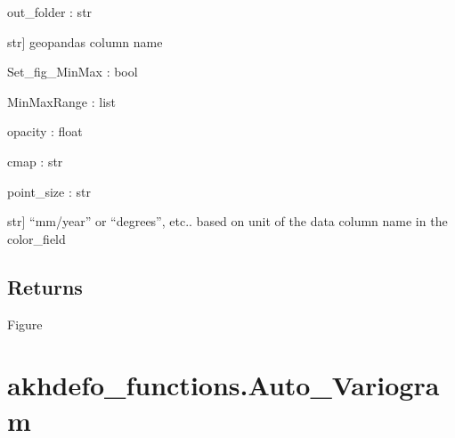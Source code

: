 \documentclass[letterpaper,10pt]{sphinxmanual}
\begin{document}
\begin{fulllineitems}
\sphinxAtStartPar
out\_folder : str
\begin{description}
\sphinxlineitem{color\_field}{[}str{]}
\sphinxAtStartPar
geopandas column name

\end{description}

\sphinxAtStartPar
Set\_fig\_MinMax : bool

\sphinxAtStartPar
MinMaxRange : list

\sphinxAtStartPar
opacity : float

\sphinxAtStartPar
cmap : str

\sphinxAtStartPar
point\_size : str
\begin{description}
\sphinxlineitem{cbar\_label}{[}str{]}
\sphinxAtStartPar
“mm/year” or “degrees”, etc.. based on unit of the data column name in the color\_field

\end{description}


\section{Returns}
\label{\detokenize{generated/akhdefo_functions.MeanProducts_plot_ts:returns}}
\sphinxAtStartPar
Figure

\end{fulllineitems}


\sphinxstepscope


\chapter{akhdefo\_functions.Auto\_Variogram}
\label{\detokenize{generated/akhdefo_functions.Auto_Variogram:akhdefo-functions-auto-variogram}}\label{\detokenize{generated/akhdefo_functions.Auto_Variogram::doc}}
\end{document}
